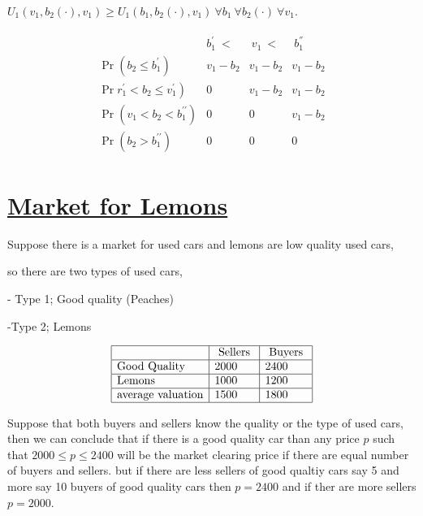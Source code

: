 \documentclass[12pt,a4paper]{article}
\begin{document}
\(U_{1}(v_{1},b_{2}(\cdot),v_{1}) \geq U_{1}(b_{1},b_{2}(\cdot), v_{1}) \ \forall b_{1} \ \forall b_{2}(\cdot) \ \forall v_{1}\).

\begin{align*}
    \begin{array}{c|c|c|c} 
    & b_{1}^{'} \ < & \ v_{1} \ < &\ b_{1}^{''}  \\
    \hline \Pr\left(b_2 \leq b_1^{\prime}\right) & v_1-b_2 & v_1-b_2 & v_1-b_2 \\
    \hline \Pr\left.r_1^{\prime}<b_2 \leq v_1^{\prime}\right) & 0 & v_1-b_2 & v_1-b_2 \\
    \hline \Pr\left(v_1<b_2<b_1^{\prime \prime}\right) & 0 & 0 & v_1-b_2 \\
    \hline \Pr\left(b_2>b_1^{\prime \prime}\right) & 0 & 0 & 0
    \end{array}
    \end{align*}

 \section*{  \underline{ Market for Lemons } } 

 Suppose there is a market for used cars and lemons are low quality used cars,

 so there are two types of used cars, 

 - Type 1; Good quality (Peaches)

 -Type 2; Lemons

 \begin{align*}
    \begin{array}{|l|l|l|}
    \hline & \text{ Sellers } & \text { Buyers } \\
    \hline \text{Good Quality} & 2000 & 2400 \\
    \hline \text{Lemons} & 1000 & 1200\\
    \hline \text{average valuation} & 1500 & 1800\\
    \hline
    \end{array}
    \end{align*}

Suppose that both buyers and sellers know the quality or the type of used cars, then we can conclude that if there is a good quality car than any price \(p\) such that \(2000 \leq p \leq 2400\)  will be the market clearing price if there are equal number of buyers and sellers. but if there are less sellers of good qualtiy cars say 5 and more say 10 buyers of good quality cars then \(p=2400\) and if ther are more sellers \(p=2000\).  
\end{document}
